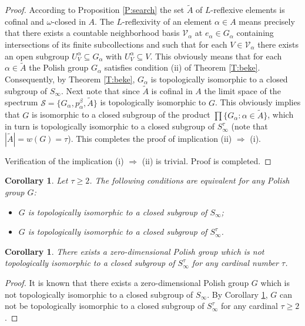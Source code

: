 \documentclass[12pt,draft]{amsart}
\theoremstyle{plain}
\newtheorem{cor}[thm]{Corollary}
\theoremstyle{definition}
\numberwithin{equation}{section}
\begin{document}
\begin{proof}
According to Proposition \ref{P:search} the set $\widetilde{A}$ of
$L$-reflexive elements is cofinal and $\omega$-closed in $A$. The
$L$-reflexivity of an element $\alpha \in A$ means precisely
that there exists a
countable neighborhood basis ${\mathcal V}_{\alpha}$ at
$e_{\alpha} \in G_{\alpha}$ containing intersections of its finite
subcollections and such that for each $V \in {\mathcal V}_{\alpha}$
there exists an open subgroup $U_{V}^{\alpha} \subseteq G_{\alpha}$
with $U_{V}^{\alpha} \subseteq V$. This obviously means that for each
$\alpha \in {\widetilde{A}}$ the Polish group $G_{\alpha}$
satisfies condition (ii)
of Theorem \ref{T:beke}. Consequently, by Theorem \ref{T:beke},
$G_{\alpha}$ is topologically isomorphic to a closed subgroup
of $S_{\infty}$. 
Next note that since $\widetilde{A}$ is cofinal in $A$ the limit
space of the spectrum
${\mathcal S} = \{ G_{\alpha}, p_{\alpha}^{\beta}, \widetilde{A}\}$
is topologically isomorphic to $G$. This obviously implies that $G$
is isomorphic to a closed subgroup of the product
$\displaystyle \prod\{ G_{\alpha} \colon \alpha \in \widetilde{A}\}$,
which in turn is topologically isomorphic to a closed
subgroup of $S_{\infty}^{\tau}$ (note that
$|\widetilde{A}| = w(G) = \tau$). This completes
the proof of implication (ii) $\Longrightarrow$ (i).

Verification of the implication (i) $\Longrightarrow$ (ii)
is trivial. Proof is completed.
\end{proof}

\begin{cor}\label{C:polish}
Let $\tau \geq 2$. The following conditions are equivalent
for any Polish group $G$:
\begin{itemize}
\item[(i)]
$G$ is topologically isomorphic to a closed subgroup of $S_{\infty}$;
\item[(ii)]
$G$ is topologically isomorphic to a closed subgroup of $S_{\infty}^{\tau}$.
\end{itemize}
\end{cor}


\begin{cor}\label{C:doug}
There exists a zero-dimensional Polish group which is not
topologically isomorphic to a closed subgroup of
$S_{\infty}^{\tau}$ for any cardinal number $\tau$.
\end{cor}
\begin{proof}
It is known \cite{dough94} that there exists a zero-dimensional
Polish group $G$ which is not topologically isomorphic to a
closed subgroup of $S_{\infty}$. By Corollary \ref{C:doug}, $G$
can not be topologically isomorphic to a closed subgroup of
$S_{\infty}^{\tau}$ for
any cardinal $\tau \geq 2$.
\end{proof}
\end{document}
